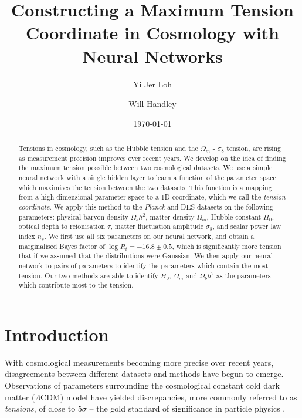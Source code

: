 \documentclass[%
 reprint,
 amsmath,amssymb,
 aps,
]{revtex4-2}
\begin{document}

\title{Constructing a Maximum Tension Coordinate in Cosmology with Neural Networks}

\author{Yi Jer Loh}
\author{Will Handley}
%

\date{\today}

\begin{abstract}
Tensions in cosmology, such as the Hubble tension and the $\Omega_m$ - $\sigma_8$ tension, are rising as measurement precision improves over recent years. We develop on the idea of finding the maximum tension possible between two cosmological datasets. We use a simple neural network with a single hidden layer to learn a function of the parameter space which maximises the tension between the two datasets. This function is a mapping from a high-dimensional parameter space to a 1D coordinate, which we call the \textit{tension coordinate}. We apply this method to the \textit{Planck} and DES datasets on the following parameters: physical baryon density $\Omega_b h^2$, matter density $\Omega_m$, Hubble constant $H_0$, optical depth to reionisation $\tau$, matter fluctuation amplitude $\sigma_8$, and scalar power law index $n_s$. We first use all six parameters on our neural network, and obtain a marginalised Bayes factor of $\log R_t = -16.8 \pm 0.5$, which is significantly more tension that if we assumed that the distributions were Gaussian. We then apply our neural network to pairs of parameters to identify the parameters which contain the most tension. Our two methods are able to identify $H_0$, $\Omega_m$ and $\Omega_b h^2$ as the parameters which contribute most to the tension.
\end{abstract}

\maketitle



\section{Introduction} \label{intro}

With cosmological measurements becoming more precise over recent years, disagreements between different datasets and methods have begun to emerge. Observations of parameters surrounding the cosmological constant cold dark matter ($\Lambda \textrm{CDM}$) model have yielded discrepancies, more commonly referred to as \textit{tensions}, of close to $5\sigma$ -- the gold standard of significance in particle physics \cite{Franklin2013}. 
\end{document}
